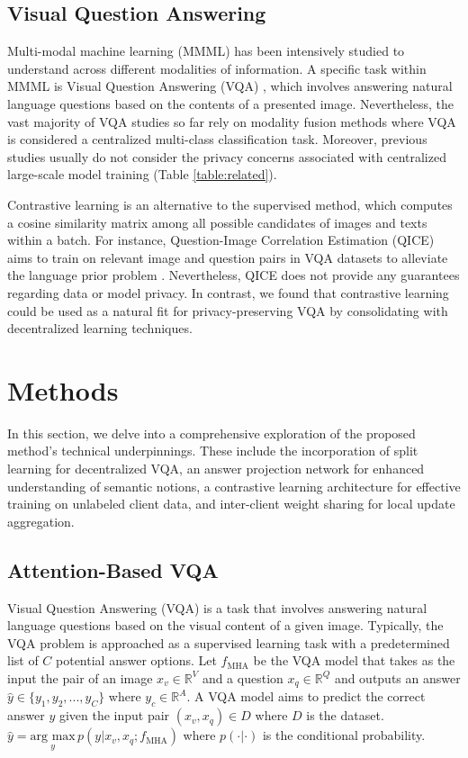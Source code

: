 \documentclass[letterpaper]{article} %
\begin{document}
\subsection{Visual Question Answering}
Multi-modal machine learning (MMML) \cite{mmv,clip,avlnet,dalle,dalle2} has been intensively studied to understand across different modalities of information. A specific task within MMML is Visual Question Answering (VQA) \cite{butd,mmnas}, which involves answering natural language questions based on the contents of a presented image. Nevertheless, the vast majority of VQA studies so far rely on modality fusion methods where VQA is considered a centralized multi-class classification task. Moreover, previous studies usually do not consider the privacy concerns associated with centralized large-scale model training (Table \ref{table:related}).

Contrastive learning is an alternative to the supervised method, which computes a cosine similarity matrix among all possible candidates of images and texts within a batch. For instance, Question-Image Correlation Estimation (QICE) \cite{zhu20} aims to train on relevant image and question pairs in VQA datasets to alleviate the language prior problem \cite{prior2}. Nevertheless, QICE does not provide any guarantees regarding data or model privacy. In contrast, we found that contrastive learning could be used as a natural fit for privacy-preserving VQA by consolidating with decentralized learning techniques. 


\section{Methods}

In this section, we delve into a comprehensive exploration of the proposed method's technical underpinnings. These include the incorporation of split learning for decentralized VQA, an answer projection network for enhanced understanding of semantic notions, a contrastive learning architecture for effective training on unlabeled client data, and inter-client weight sharing for local update aggregation.

\subsection{Attention-Based VQA}
Visual Question Answering (VQA) is a task that involves answering natural language questions based on the visual content of a given image. Typically, the VQA problem is approached as a supervised learning task with a predetermined list of $C$ potential answer options. Let $f_{\text{MHA}}$ be the VQA model that takes as the input the pair of an image $x_v\in \mathbb{R}^V$ and a question $x_q\in \mathbb{R}^Q$ and outputs an answer $\hat{y} \in \{y_1,y_2,...,y_C\}$ where $y_c \in \mathbb{R}^A$. A VQA model aims to predict the correct answer $y$ given the input pair $(x_v,x_q) \in D$ where $D$ is the dataset. $\hat{y}=\underset{y}{\mbox{arg max}}\,p(y|x_v,x_q;f_{\text{MHA}})$ where $p(\cdot|\cdot)$ is the conditional probability. 
\end{document}

